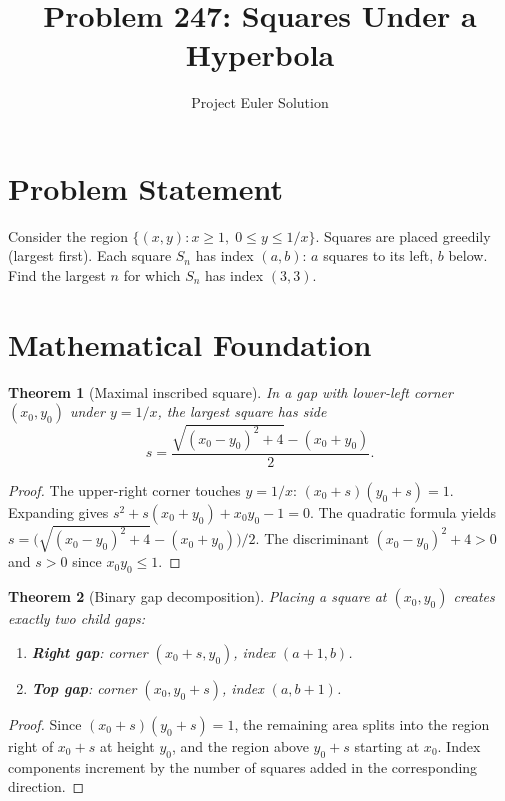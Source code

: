\documentclass[12pt]{article}
\title{Problem 247: Squares Under a Hyperbola}
\author{Project Euler Solution}
\date{}
\newtheorem{theorem}{Theorem}
\begin{document}
\maketitle

\section{Problem Statement}

Consider the region $\{(x,y):x\ge 1,\;0\le y\le 1/x\}$. Squares are placed greedily (largest first). Each square $S_n$ has index $(a,b)$: $a$ squares to its left, $b$ below. Find the largest $n$ for which $S_n$ has index $(3,3)$.

\section{Mathematical Foundation}

\begin{theorem}[Maximal inscribed square]\label{thm:side}
In a gap with lower-left corner $(x_0,y_0)$ under $y=1/x$, the largest square has side
\[
s=\frac{\sqrt{(x_0-y_0)^2+4}-(x_0+y_0)}{2}.
\]
\end{theorem}

\begin{proof}
The upper-right corner touches $y=1/x$: $(x_0+s)(y_0+s)=1$. Expanding gives $s^2+s(x_0+y_0)+x_0y_0-1=0$. The quadratic formula yields $s=\bigl(\sqrt{(x_0-y_0)^2+4}-(x_0+y_0)\bigr)/2$. The discriminant $(x_0-y_0)^2+4>0$ and $s>0$ since $x_0y_0\le 1$.
\end{proof}

\begin{theorem}[Binary gap decomposition]\label{thm:split}
Placing a square at $(x_0,y_0)$ creates exactly two child gaps:
\begin{enumerate}
\item \textbf{Right gap}: corner $(x_0+s,y_0)$, index $(a+1,b)$.
\item \textbf{Top gap}: corner $(x_0,y_0+s)$, index $(a,b+1)$.
\end{enumerate}
\end{theorem}

\begin{proof}
Since $(x_0+s)(y_0+s)=1$, the remaining area splits into the region right of $x_0+s$ at height $y_0$, and the region above $y_0+s$ starting at $x_0$. Index components increment by the number of squares added in the corresponding direction.
\end{proof}
\end{document}
